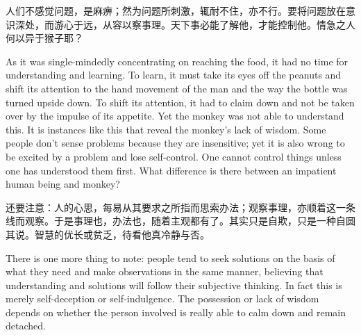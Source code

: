 {	人们不感觉问题，是麻痹；然为问题所刺激，辄耐不住，亦不行。要将问题放在意识深处，而游心于远，从容以察事理。天下事必能了解他，才能控制他。情急之人何以异于猴子耶？
	
	
	As it was single-mindedly concentrating on reaching the food, it had no time for understanding and learning. To learn, it must take its eyes off the peanuts and shift its attention to the hand movement of the man and the way the bottle was turned upside down. To shift its attention, it had to claim down and not be taken over by the impulse of its appetite. Yet the monkey was not able to understand this. It is instances like this that reveal the monkey's lack of wisdom.
	Some people don't sense problems because they are insensitive; yet it is also wrong to be excited by a problem and lose self-control. One cannot control things unless one has understood them first. What difference is there between an impatient human being and monkey?
	
	还要注意：人的心思，每易从其要求之所指而思索办法；观察事理，亦顺着这一条线而观察。于是事理也，办法也，随着主观都有了。其实只是自欺，只是一种自圆其说。智慧的优长或贫乏，待看他真冷静与否。
	
	There is one more thing to note: people tend to seek solutions on the basis of what they need and make observations in the same manner, believing that understanding and solutions will follow their subjective thinking. In fact this is merely self-deception or self-indulgence. The possession or lack of wisdom depends on whether the person involved is really able to calm down and remain detached.}
